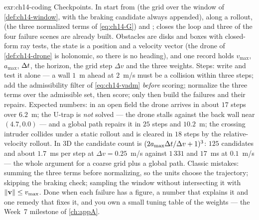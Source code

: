 
\begin{solution}{exr:ch14-coding}
Checkpoints. In  start from  (the grid over
the window of \cref{def:ch14-window}, with the braking candidate always appended),
 along a rollout,  (the three normalized terms of
\cref{eq:ch14-G}) and ;  closes the loop and three of
the four failure scenes are already built. Obstacles are disks and boxes with closed-form
ray tests, the state is a position and a velocity vector (the drone of
\cref{def:ch14-drone} is holonomic, so there is no heading), and one 
record holds $v_{\max}$, $a_{\max}$, $\Delta t$, the horizon, the grid step $\Delta v$ and the
three weights. Steps: write  and test it alone --- a wall $1$~m ahead
at $2$~m/s must be a collision within three steps; add the admissibility filter of
\cref{eq:ch14-vadm} \emph{before} scoring; normalize the three terms over the admissible
set, then score; only then build the failures and their repairs. Expected numbers: in an
open field the drone arrives in about $17$ steps over $6.2$~m; the U-trap is \emph{not}
solved --- the drone stalls against the back wall near $(4.7,0.0)$ --- and a global \astar
path repairs it in $25$ steps and $10.2$~m; the crossing intruder collides under a static
rollout and is cleared in $18$ steps by the relative-velocity rollout. In 3D the candidate
count is $(2a_{\max}\Delta t/\Delta v+1)^3$: $125$ candidates and about $1.7$~ms per step at
$\Delta v=0.25$~m/s against $1\,331$ and $17$~ms at $0.1$~m/s --- the whole argument for a
coarse grid plus a global path. Classic mistakes: summing the three terms before
normalizing, so the units choose the trajectory; skipping the braking check; sampling the
window without intersecting it with $\left\lVert \mathbf{v} \right\rVert\le v_{\max}$. Done when each failure has
a figure, a number that explains it and one remedy that fixes it, and you own a small
tuning table of the weights --- the Week~7 milestone of \cref{ch:appA}.
\end{solution}

